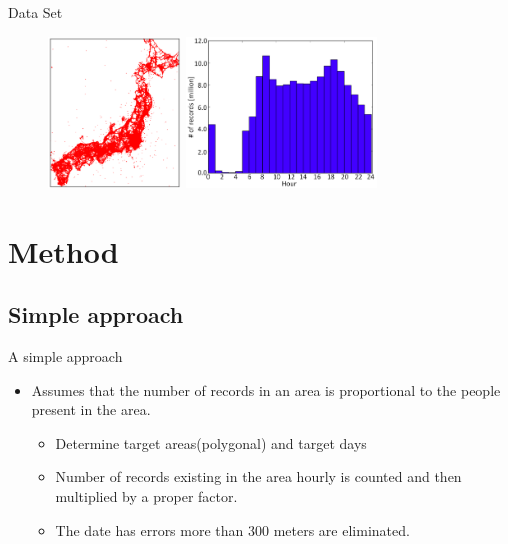 \begin{frame}{Data Set}

\begin{figure}
\includegraphics[height = 4cm]{pic2.png}
\includegraphics[height = 4cm]{pic3.png}
\end{figure}

\end{frame}

\section{Method}\label{method}

\subsection{Simple approach}\label{simple-approach}

\begin{frame}{A simple approach}

\begin{itemize}
\itemsep1pt\parskip0pt
\item
  Assumes that the number of records in an area is proportional to the
  people present in the area.

  \begin{itemize}
  \itemsep1pt\parskip0pt
  \item
    Determine target areas(polygonal) and target days
  \item
    Number of records existing in the area hourly is counted and then
    multiplied by a proper factor.
  \item
    The date has errors more than 300 meters are eliminated.
  \end{itemize}
\end{itemize}

\end{frame}


